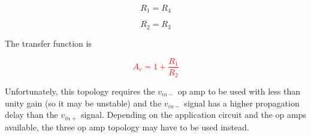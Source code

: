 \begin{equation}
R_{1} = R_{4}
\end{equation}

\begin{equation}
R_{2} = R_{3}
\end{equation}

The transfer function is

\textcolor{red}{
\begin{equation}
A_{v} = 1+\frac{R_{1}}{R_{2}}
\label{eq:twoinamp}
\end{equation}
}

Unfortunately, this topology requires the $v_{in-}$ op amp to be used with less than unity gain (so it may be unstable) and the $v_{in-}$ signal has a higher propagation delay than the $v_{in+}$ signal.
Depending on the application circuit and the op amps available, the three op amp topology may have to be used instead.